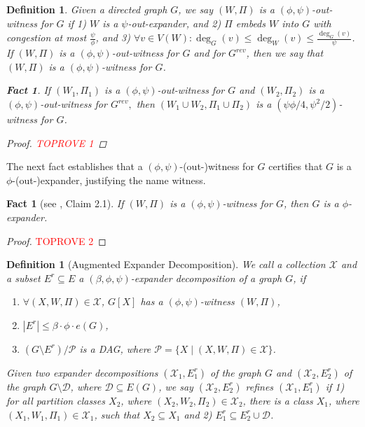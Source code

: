 \documentclass[11pt]{article}
\newtheorem{fact}[theorem]{Fact}
\newtheorem{definition}[theorem]{Definition}
\begin{document}
\begin{definition}\label{def:Witness}
    Given a directed graph $G$, we say $(W, \Pi)$ is a $(\phi, \psi)$-out-witness for $G$ if 1) $W$ is a $\psi$-out-expander, and 2) $\Pi$ embeds $W$ into $G$ with congestion at most $\frac{\psi}{\phi}$, and 3) $ \forall v \in V(W): \deg_{G}(v) \leq \deg_{W}(v) \leq \frac{\deg_G(v)}{\psi}$. If $(W, \Pi)$ is a $(\phi, \psi)$-out-witness for $G$ and for $G^{rev}$, then we say that $(W, \Pi)$ is a $(\phi, \psi)$-witness for $G$.

\begin{fact}
    If $(W_1, \Pi_1)$ is a $(\phi, \psi)$-out-witness for $G$ and $(W_2, \Pi_2)$ is a $(\phi, \psi)$-out-witness for $G^{rev},$ then $(W_1 \cup W_2, \Pi_1 \cup \Pi_2)$ is a $(\psi\phi/4, \psi^2/2)$-witness for $G$.
\end{fact}

\begin{proof}\textcolor{red}{TOPROVE 1}\end{proof}

\end{definition}

The next fact establishes that a $(\phi, \psi)$-(out-)witness for $G$ certifies that $G$ is a $\phi$-(out-)expander, justifying the name witness.

\begin{fact}[see \cite{hua2023maintaining}, Claim 2.1]\label{fact}
If $(W, \Pi)$ is a $(\phi,\psi)$-witness for $G$, then $G$ is a $\phi$-expander.
\end{fact}

\begin{proof}\textcolor{red}{TOPROVE 2}\end{proof}

\begin{definition}[Augmented Expander Decomposition]\label{def:augmentedED}
    We call a collection $\mathcal{X}$ and a subset $E^r \subseteq E$ a $(\beta, \phi, \psi)$-expander decomposition of a graph $G$, if 
    \begin{enumerate}
        \item \label{Def:ED-item1} $\forall (X, W, \Pi) \in \mathcal{X}$, $G[X]$ has a $(\phi, \psi)$-witness $(W, \Pi)$,
        \item \label{Def:ED-item2} $|E^r| \leq \beta \cdot \phi \cdot e(G)$,
        \item \label{Def:ED-item3} $(G \setminus E^r)/ \mathcal{P}$ is a DAG, where $\mathcal{P} = \{X \mid (X, W, \Pi) \in \mathcal{X}\}$.
    \end{enumerate}
    Given two expander decompositions $(\mathcal{X}_1,E^r_1)$ of the graph $G$ and  $ (\mathcal{X}_2,E^r_2)$ of the graph $G \setminus \mathcal{D}$, where $\mathcal{D} \subseteq E(G)$, we say $(\mathcal{X}_2,E^r_2)$ refines $(\mathcal{X}_1,E^r_1)$ if 1) for all partition classes $X_2$, where $(X_2, W_2, \Pi_2) \in \mathcal{X}_2$, there is a class $X_1$, where 
    $(X_1, W_1, \Pi_1) \in \mathcal{X}_1$, such that $X_2 \subseteq X_1$ and 2) $E_1^r \subseteq E_2^r \cup \mathcal{D}$.
\end{definition}
\end{document}
